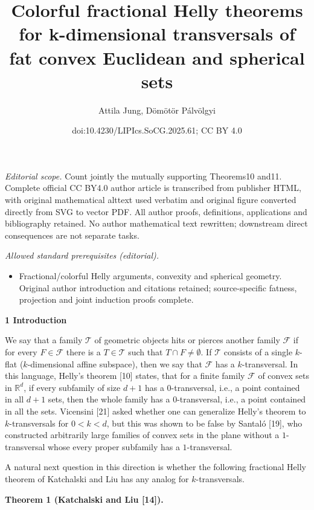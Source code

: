 \documentclass[10pt,a4paper]{amsart}
\title{Colorful fractional Helly theorems for k-dimensional transversals of fat convex Euclidean and spherical sets}
\author{Attila Jung, Dömötör Pálvölgyi}
\date{doi:10.4230/LIPIcs.SoCG.2025.61; CC BY 4.0}
\begin{document}
\maketitle
\noindent\textit{Editorial scope.} Count jointly the mutually supporting Theorems10 and11. Complete official CC BY4.0 author article is transcribed from publisher HTML, with original mathematical alttext used verbatim and original figure converted directly from SVG to vector PDF. All author proofs, definitions, applications and bibliography retained. No author mathematical text rewritten; downstream direct consequences are not separate tasks.\par\medskip
\noindent\textit{Allowed standard prerequisites (editorial).}\begin{itemize}
\item Fractional/colorful Helly arguments, convexity and spherical geometry. Original author introduction and citations retained; source-specific fatness, projection and joint induction proofs complete.
\end{itemize}\medskip
\par\medskip\noindent\textbf{1 Introduction}\par
We say that a family $\mathcal{T}$ of geometric objects hits or pierces another family $\mathcal{F}$ if for every $F\in\mathcal{F}$ there is a $T\in\mathcal{T}$ such that $T\cap F\neq\emptyset$. If $\mathcal{T}$ consists of a single $k$-flat ($k$-dimensional affine subspace), then we say that $\mathcal{F}$ has a $k$-transversal. In this language, Helly’s theorem [10] states, that for a finite family $\mathcal{F}$ of convex sets in $\mathbb{R}^{d}$, if every subfamily of size $d+1$ has a $0$-transversal, i.e., a point contained in all $d+1$ sets, then the whole family has a $0$-transversal, i.e., a point contained in all the sets. Vicensini [21] asked whether one can generalize Helly’s theorem to $k$-transversals for $0<k<d$, but this was shown to be false by Santaló [19], who constructed arbitrarily large families of convex sets in the plane without a $1$-transversal whose every proper subfamily has a $1$-transversal.
\par
\par
A natural next question in this direction is whether the following fractional Helly theorem of Katchalski and Liu has any analog for $k$-transversals.
\par
\par
\par\medskip\noindent\textbf{Theorem 1 (Katchalski and Liu [14]).}\par
\end{document}

